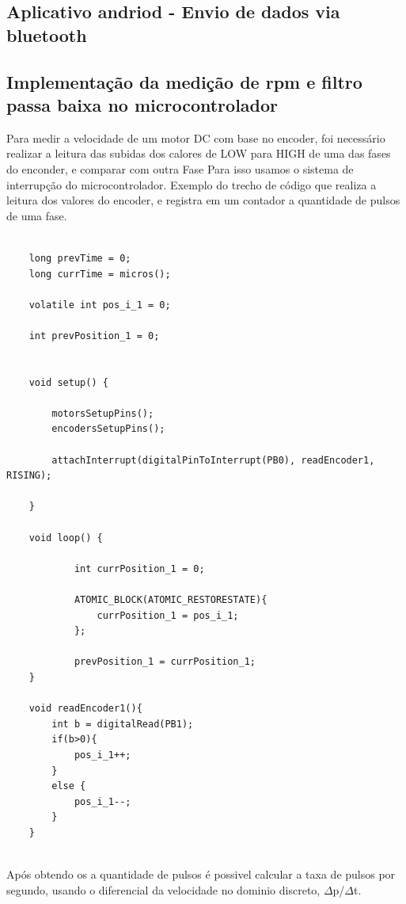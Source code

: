 	
	\subsection{Aplicativo andriod - Envio de dados via bluetooth}
	
	
	\subsection{Implementação da medição de rpm e filtro passa baixa no microcontrolador}
	
	Para medir a velocidade de um motor DC com base no encoder, foi necessário realizar a leitura das subidas dos calores de LOW para HIGH de uma das fases do enconder, e comparar com outra Fase
	Para isso usamos o sistema de interrupção do microcontrolador.
	Exemplo do trecho de código que realiza a leitura dos valores do encoder, e registra em um contador a quantidade de pulsos de uma fase.
	
	
	\lstset{language=C}
	\begin{lstlisting}
	
	long prevTime = 0;
	long currTime = micros();
	
	volatile int pos_i_1 = 0;
	
	int prevPosition_1 = 0;
	
	
	void setup() {
	
		motorsSetupPins();
		encodersSetupPins();
	
		attachInterrupt(digitalPinToInterrupt(PB0), readEncoder1, RISING);
		
	}
	
	void loop() {
	
			int currPosition_1 = 0;
	
			ATOMIC_BLOCK(ATOMIC_RESTORESTATE){
				currPosition_1 = pos_i_1;
			};
			
			prevPosition_1 = currPosition_1;
	}
	
	void readEncoder1(){ 
		int b = digitalRead(PB1);
		if(b>0){
			pos_i_1++;
		}
		else {
			pos_i_1--;
		}
	}
	
	\end{lstlisting}
	
	
	Após obtendo os a quantidade de pulsos é possivel calcular a taxa de pulsos por segundo, usando o diferencial da velocidade no dominio discreto, $\Delta$p/$\Delta$t.
	
